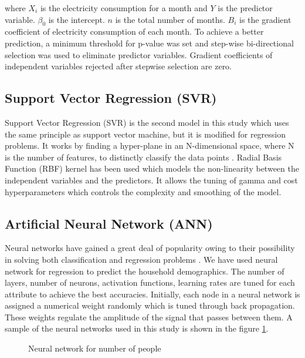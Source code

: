 \documentclass[conference]{IEEEtran}
\begin{document}
where \(X_i\) is the electricity consumption for a month and \(Y\) is the predictor variable. \({\beta}_0\) is the intercept. \(n\) is the total number of months. \(B_i\) is the gradient coefficient of electricity consumption of each month. To achieve a better prediction, a minimum threshold for p-value was set and step-wise bi-directional selection \cite{wang2013comparison} was used to eliminate predictor variables. Gradient coefficients of independent variables rejected after stepwise selection are zero.


\subsection{Support Vector Regression (SVR)}
Support Vector Regression (SVR) is the second model in this study which uses the same principle as support vector machine, but it is modified for regression problems. It works by finding a hyper-plane in an N-dimensional space, where N is the number of features, to distinctly classify the data points \cite{drucker1997support}. Radial Basis Function (RBF) kernel has been used which models the non-linearity between the independent variables and the predictors. It allows the tuning of gamma and cost hyperparameters which controls the complexity and smoothing of the model.



\subsection{Artificial Neural Network (ANN)}
Neural networks have gained a great deal of popularity owing to their possibility in solving both classification and regression problems \cite{specht1991general}. We have used neural network for regression to predict the household demographics. The number of layers, number of neurons, activation functions, learning rates are tuned for each attribute to achieve the best accuracies. Initially, each node in a neural network is assigned a numerical weight randomly which is tuned through back propagation. These weights regulate the amplitude of the signal that passes between them. A sample of the neural networks used in this study is shown in the figure \ref{fig:nn for no of people}.


\begin{figure}[ht]
\caption{Neural network for number of people}
\label{fig:nn for no of people}
\end{figure}
\end{document}

